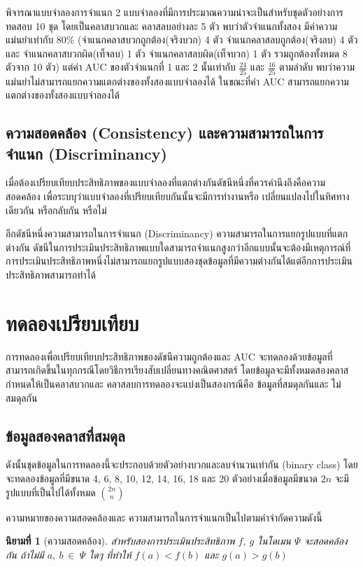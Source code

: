 \documentclass[twoside, twocolumn, 12pt]{article}
\newtheorem{mydef}{นิยามที่}
\begin{document}
พิจารณาแบบจำลองการจำแนก 2 แบบจำลองที่มีการประมาณความน่าจะเป็นสำหรับชุดตัวอย่างการทดสอบ 10 ชุด โดยเป็นคลาสบวกและ คลาสลบอย่างละ 5 ตัว พบว่าตัวจำแนกทั้งสอง มีค่าความแม่นยำเท่ากับ 80\% (จำแนกคลาสบวกถูกต้อง(จริงบวก) 4 ตัว จำแนกคลาสลบถูกต้อง(จริงลบ) 4 ตัวและ จำแนกคลาสบวกผิด(เท็จลบ) 1 ตัว จำแนกคลาสลบผิด(เท็จบวก) 1 ตัว รวมถูกต้องทั้งหมด 8 ตัวจาก 10 ตัว) แต่ค่า AUC ของตัวจำแนกที่ 1 และ 2 นั้นเท่ากับ $\frac{24}{25}$ และ $\frac{16}{25}$ ตามลำดับ 
พบว่าความแม่นยำไม่สามารถแยกความแตกต่างของทั้งสองแบบจำลองได้ ในขณะที่ค่า AUC สามารถแยกความแตกต่างของทั้งสองแบบจำลองได้

\subsection{ความสอดคล้อง (Consistency) และความสามารถในการจำแนก (Discriminancy)}
\quad เมื่อต้องเปรียบเทียบประสิทธิภาพของแบบจำลองที่แตกต่างกันดัชนีหนึ่งที่ควรคำนึงถึงคือความสอดคล้อง เพื่อระบบุว่าแบบจำลองที่เปรียบเทียบกันนั้นจะมีการทำงานหรือ เปลี่ยนแปลงไปในทิศทางเดียวกัน หรือกลับกัน หรือไม่

อีกดัชนีหนึ่งความสามารถในการจำแนก (Discriminancy) ความสามารถในการแยกรูปแบบที่แตกต่างกัน ดัชนีในการประเมินประสิทธิภาพแบบใดสามารถจำแนกสูงกว่าอีกแบบนั้นจะต้องมีเหตุการณ์ที่การประเมินประสิทธิภาพหนึ่งไม่สามารถแยกรูปแบบสองชุดข้อมูลที่มีความต่างกันได้แต่อีกการประเมินประสิทธิภาพสามารถทำได้

\section{ทดลองเปรียบเทียบ}

\quad การทดลองเพื่อเปรียบเทียบประสิทธิภาพของดัชนีความถูกต้องและ AUC จะทดลองด้วยข้อมูลที่สามารถเกิดขึ้นในทุกกรณีโดยวิธีการเรียงสับเปลี่ยนทางคณิตศาสตร์ โดยข้อมูลจะมีทั้งหมดสองคลาสกำหนดให้เป็นคลาสบวกและ คลาสลบการทดลองจะแบ่งเป็นสองกรณีคือ ข้อมูลที่สมดุลกันและ ไม่สมดุลกัน

\subsection{ข้อมูลสองคลาสที่สมดุล}
\quad ดังนั้นชุดข้อมูลในการทดลองนี้จะประกอบด้วยตัวอย่างบวกและลบจำนวนเท่ากัน (binary class) โดยจะทดลองข้อมูลที่มีขนาด 4, 6, 8, 10, 12, 14, 16, 18 และ 20 ตัวอย่างเมื่อข้อมูลมีขนาด $2n$ จะมีรูปแบบที่เป็นไปได้ทั้งหมด ${{2n}\choose{n}}$ 

ความหมายของความสอดคล้องและ ความสามารถในการจำแนกเป็นไปตามคำจำกัดความดังนี้

\begin{mydef}[ความสอดคล้อง]\label{def:ความสอดคล้อง}
สำหรับสองการประเมินประสิทธิภาพ $f,\:g$ ในโดเมน $\Psi$ จะสอดคล้องกัน ถ้าไม่มี $a,\:b\:\in\:\Psi$ ใดๆ ที่ทำให้ $f(a) < f(b)$ และ $g(a) > g(b)$
\end{mydef}
\end{document}
